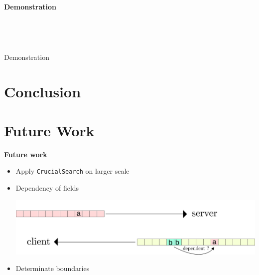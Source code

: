 \documentclass{beamer}
\newcounter{m} %
\newcounter{c} %
\begin{document}
\begin{frame}{\bf Demonstration}
  ~

  ~

  ~

  \begin{center}
    Demonstration
  \end{center}
\end{frame}


\section{Conclusion}

%

\section{Future Work}


\begin{frame}{\bf Future work}

\begin{itemize}
    \item Apply \texttt{CrucialSearch} on larger scale
    \item Dependency of fields\\
    \begin{center}\includegraphics[scale=0.5]{relations.png}\end{center}
    \item Determinate boundaries
\end{itemize}
\end{frame}
\end{document}
